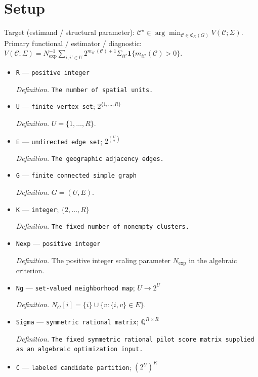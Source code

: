 \documentclass{article}
\begin{document}
\section{Setup}

Target (estimand / structural parameter): \(\mathcal C^\star\in\arg\min_{\mathcal C\in\mathfrak C_K(G)}V(\mathcal C;\Sigma)\).
Primary functional / estimator / diagnostic: \(V(\mathcal C;\Sigma)=N_{\exp}^{-1}\sum_{i,i'\in U}2^{m_{ii'}(\mathcal C)+1}\Sigma_{ii'}\mathbf 1\{m_{ii'}(\mathcal C)>0\}\).
\begin{itemize}
  \item \texttt{R} --- \texttt{positive integer}
  \par\smallskip\noindent\emph{Definition.} \texttt{The number of spatial units.}
  \item \texttt{U} --- \texttt{finite vertex set}; \(2^{\{1,\ldots,R\}}\)
  \par\smallskip\noindent\emph{Definition.} \(U=\{1,\ldots,R\}\).
  \item \texttt{E} --- \texttt{undirected edge set}; \(2^{\binom{U}{2}}\)
  \par\smallskip\noindent\emph{Definition.} \texttt{The geographic adjacency edges.}
  \item \texttt{G} --- \texttt{finite connected simple graph}
  \par\smallskip\noindent\emph{Definition.} \(G=(U,E)\).
  \item \texttt{K} --- \texttt{integer}; \(\{2,\ldots,R\}\)
  \par\smallskip\noindent\emph{Definition.} \texttt{The fixed number of nonempty clusters.}
  \item \texttt{Nexp} --- \texttt{positive integer}
  \par\smallskip\noindent\emph{Definition.} The positive integer scaling parameter \(N_{\exp}\) in the algebraic criterion.
  \item \texttt{Ng} --- \texttt{set-\allowbreak{}valued neighborhood map}; \(U\to 2^U\)
  \par\smallskip\noindent\emph{Definition.} \(N_G[i]=\{i\}\cup\{v:\{i,v\}\in E\}\).
  \item \texttt{Sigma} --- \texttt{symmetric rational matrix}; \(\mathbb Q^{R\times R}\)
  \par\smallskip\noindent\emph{Definition.} \texttt{The fixed symmetric rational pilot score matrix supplied as an algebraic optimization input.}
  \item \texttt{C} --- \texttt{labeled candidate partition}; \((2^U)^K\)

\end{itemize}
\end{document}
